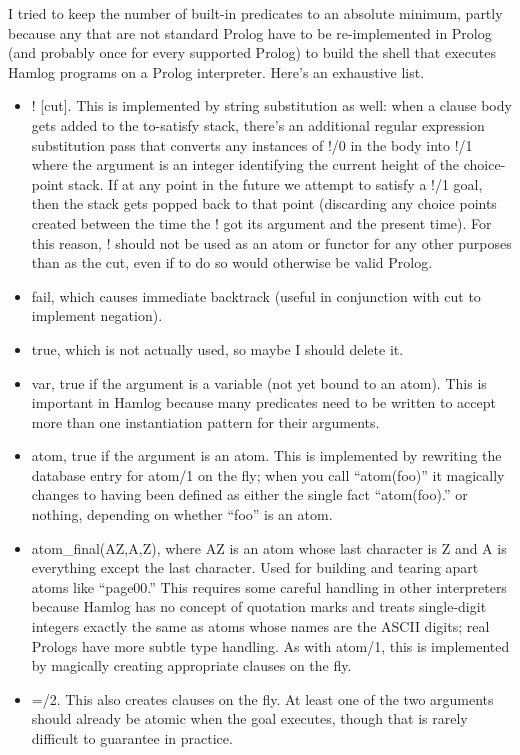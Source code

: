 \documentclass[14pt]{extarticle}
\begin{document}
I tried to keep the number of built-in predicates to an absolute minimum,
partly because any that are not standard Prolog have to be re-implemented in
Prolog (and probably once for every supported Prolog) to build the shell
that executes Hamlog programs on a Prolog interpreter.  Here's an exhaustive
list.

\begin{itemize}
  \item ! [cut].  This is implemented by string substitution as well:  when
  a clause body gets added to the to-satisfy stack, there's an additional
  regular expression substitution pass that converts any instances of !/0 in
  the body into !/1 where the argument is an integer identifying the current
  height of the choice-point stack.  If at any point in the future we
  attempt to satisfy a !/1 goal, then the stack gets popped back to that
  point (discarding any choice points created between the time the
  ! got its argument and the present time).  For this reason, ! should not
  be used as an atom or functor for any other purposes than as the cut,
  even if to do so would otherwise be valid Prolog.

  \item fail, which causes immediate backtrack (useful in conjunction with
  cut to implement negation).

  \item true, which is not actually used, so maybe I should delete it.

  \item var, true if the argument is a variable (not yet bound to an atom). 
  This is important in Hamlog because many predicates need to be written to
  accept more than one instantiation pattern for their arguments.

  \item atom, true if the argument is an atom.  This is implemented by
  rewriting the database entry for atom/1 on the fly; when you call
  ``atom(foo)'' it magically changes to having been defined as either
  the single fact ``atom(foo).'' or nothing, depending on whether
  ``foo'' is an atom.
  
  \item atom\_final(AZ,A,Z), where AZ is an atom whose last character is Z
  and A is everything except the last character.  Used for building and
  tearing apart atoms like ``page00.''  This requires some careful handling
  in other interpreters because Hamlog has no concept of quotation marks and
  treats single-digit integers exactly the same as atoms whose names are the
  ASCII digits; real Prologs have more subtle type handling.  As with
  atom/1, this is implemented by magically creating appropriate clauses on
  the fly.
  
  \item =/2.  This also creates clauses on the fly.  At least one of the two
  arguments should already be atomic when the goal executes, though that is
  rarely difficult to guarantee in practice.
\end{itemize}
\end{document}
